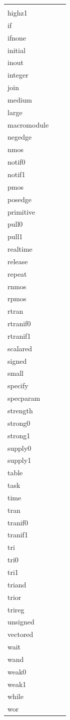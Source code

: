 \documentclass[11pt]{article}
\begin{document}
\begin{center}
\begin{tabular}{|>{\raggedright\arraybackslash}p{}|>{\raggedright\arraybackslash}p{}|>{\raggedright\arraybackslash}p{}|}
{\begin{multicols}{2}
highz0\\
highz1\\
if\\
ifnone\\
initial\\
inout\\
integer\\
join\\
medium\\
large\\
macromodule\\
negedge\\
nmos\\
notif0\\
notif1\\
pmos\\
posedge\\
primitive\\
pull0\\
pull1\\
realtime\\
release\\
repeat\\
rnmos\\
rpmos\\
rtran\\
rtranif0\\
rtranif1\\
scalared\\
signed\\
small\\
specify\\
specparam\\
strength\\
strong0\\
strong1\\
supply0\\
supply1\\
table\\
task\\
time\\
tran\\
tranif0\\
tranif1\\
tri\\
tri0\\
tri1\\
triand\\
trior\\
trireg\\
unsigned\\
vectored\\
wait\\
wand\\
weak0\\
weak1\\
while\\
wor
\end{multicols}}
\\
\hline
\end{tabular}
\end{center}
\end{document}
